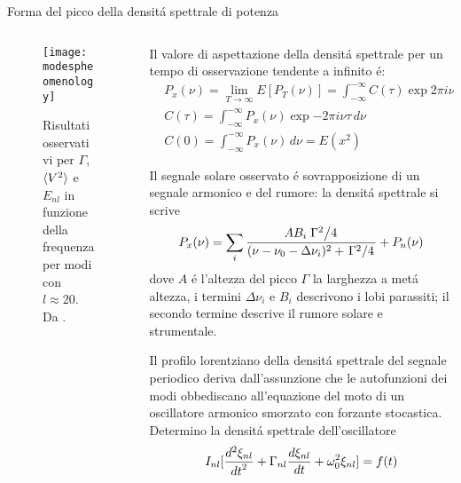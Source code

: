 \begin{frame}{Forma del picco della densit\'a spettrale di potenza}

\begin{columns}

\begin{column}{0.45\textwidth}

\begin{figure}[!ht]
\centering
\texttt{[image: modespheomenology]}
\caption{Risultati osservativi per $\Gamma$, $\exv{V^2}$ e $E_{nl}$ in funzione della frequenza per modi con $l\approx20$. Da \cite{libbrecht1988solar}.}\label{fig:Powerspectraldensity}
\end{figure}

\end{column}

\begin{column}{0.45\textwidth}

Il valore di aspettazione della densit\'a spettrale per un tempo di osservazione tendente a infinito \'e:
\begin{align}
&P_x(\nu)=\lim_{T\to\infty}{E[P_T(\nu)]}=\int_{-\infty}^{-\infty}C(\tau)\exp{2\pi i\nu\tau}\,d\tau\\
&C(\tau)=\int_{-\infty}^{-\infty}P_x(\nu)\exp{-2\pi i\nu\tau}\,d\nu\\
&C(0)=\int_{-\infty}^{-\infty}P_x(\nu)\,d\nu=E(x^2)
\end{align}

Il segnale solare osservato \'e sovrapposizione di un segnale armonico e del rumore: la densit\'a spettrale si scrive
\begin{equation}
P_x(\nu)=\sum_i\frac{AB_i\midfrac{\Gamma^2}{4}}{(\nu-\nu_0-\Delta\nu_i)^2+\midfrac{\Gamma^2}{4}}+P_n(\nu)
\end{equation}
dove $A$ \'e l'altezza del picco $\Gamma$ la larghezza a met\'a altezza, i termini $\Delta\nu_i$ e $B_i$ descrivono i lobi parassiti; il secondo termine descrive il rumore solare e strumentale.

Il profilo lorentziano della densit\'a spettrale del segnale periodico deriva dall'assunzione che le autofunzioni dei modi obbediscano all'equazione del moto di un oscillatore armonico smorzato con forzante stocastica. Determino la densit\'a spettrale dell'oscillatore
\begin{equation}
I_{nl}[\TtwoDy{t}{\xi_{nl}}+\Gamma_{nl}\TDy{t}{\xi_{nl}}+\omega_0^2\xi_{nl}]=f(t)
\end{equation}


\end{column}
\end{columns}
\end{frame}
